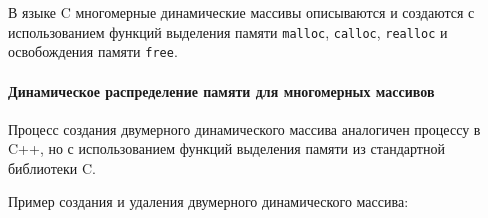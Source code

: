 \documentclass[
]{article}
\begin{document}
В языке C многомерные динамические массивы описываются и создаются с
использованием функций выделения памяти \texttt{malloc},
\texttt{calloc}, \texttt{realloc} и освобождения памяти \texttt{free}.

\paragraph{Динамическое распределение памяти для многомерных
массивов}\label{ux434ux438ux43dux430ux43cux438ux447ux435ux441ux43aux43eux435-ux440ux430ux441ux43fux440ux435ux434ux435ux43bux435ux43dux438ux435-ux43fux430ux43cux44fux442ux438-ux434ux43bux44f-ux43cux43dux43eux433ux43eux43cux435ux440ux43dux44bux445-ux43cux430ux441ux441ux438ux432ux43eux432-1}

Процесс создания двумерного динамического массива аналогичен процессу в
C++, но с использованием функций выделения памяти из стандартной
библиотеки C.

Пример создания и удаления двумерного динамического массива:
\end{document}
